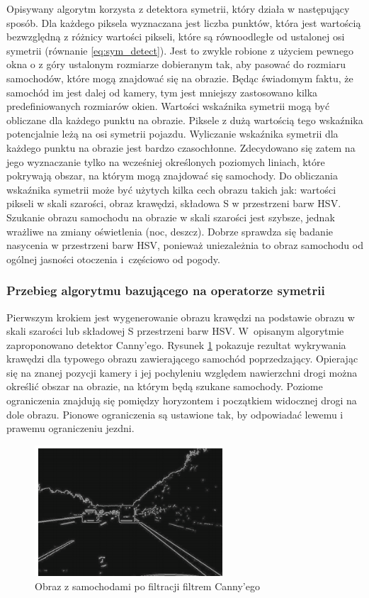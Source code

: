 Opisywany algorytm korzysta z detektora symetrii, który działa w następujący sposób. 
Dla każdego piksela wyznaczana jest liczba punktów, która jest wartością bezwzględną z różnicy wartości pikseli, które są równoodległe od ustalonej osi symetrii (równanie \ref{eq:sym_detect}). Jest to zwykle robione z użyciem pewnego okna o z góry ustalonym rozmiarze dobieranym tak, aby pasować do rozmiaru samochodów, które mogą znajdować się na obrazie. 
Będąc świadomym faktu, że samochód im jest dalej od kamery, tym jest mniejszy zastosowano kilka predefiniowanych rozmiarów okien. 
Wartości wskaźnika symetrii mogą być obliczane dla każdego punktu na obrazie. 
Piksele z dużą wartością tego wskaźnika potencjalnie leżą na osi symetrii pojazdu.
Wyliczanie wskaźnika symetrii dla każdego punktu na obrazie jest bardzo czasochłonne. 
Zdecydowano się zatem na jego wyznaczanie tylko na wcześniej określonych poziomych liniach, które pokrywają obszar, na którym mogą znajdować się samochody. 
Do obliczania wskaźnika symetrii może być użytych kilka cech obrazu takich jak: wartości pikseli w skali szarości, obraz krawędzi, składowa S w przestrzeni barw HSV. 
Szukanie obrazu samochodu na obrazie w skali szarości jest szybsze, jednak wrażliwe na zmiany oświetlenia (noc, deszcz). 
Dobrze sprawdza się badanie nasycenia w przestrzeni barw HSV, ponieważ uniezależnia to obraz samochodu od ogólnej jasności otoczenia i~częściowo od pogody.

\subsubsection{Przebieg algorytmu bazującego na operatorze symetrii}

Pierwszym krokiem jest wygenerowanie obrazu krawędzi na podstawie obrazu w skali szarości lub składowej S przestrzeni barw HSV. 
W~opisanym algorytmie zaproponowano detektor Canny'ego. 
Rysunek \ref{fig:car_edge} pokazuje rezultat wykrywania krawędzi dla typowego obrazu zawierającego samochód poprzedzający. 
Opierając się na znanej pozycji kamery i jej pochyleniu względem nawierzchni drogi można określić obszar na obrazie, na którym będą szukane samochody. 
Poziome ograniczenia znajdują się pomiędzy horyzontem i początkiem widocznej drogi na dole obrazu. 
Pionowe ograniczenia są ustawione tak, by odpowiadać lewemu i prawemu ograniczeniu jezdni. 

\begin{figure}
  \centering
  \includegraphics[width=7cm]{img/car_canny.png}
  \caption{Obraz z samochodami po filtracji filtrem Canny'ego\cite{T1}}
  \label{fig:car_edge}
\end{figure}

